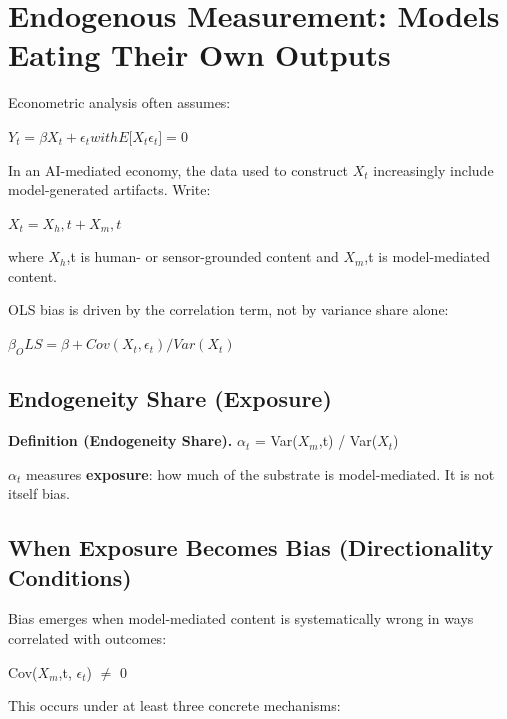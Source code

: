 \documentclass[11pt,a4paper]{article}
\begin{document}
\hypertarget{endogenous-measurement-models-eating-their-own-outputs}{%
\section{Endogenous Measurement: Models Eating Their Own Outputs}\label{endogenous-measurement-models-eating-their-own-outputs}}

Econometric analysis often assumes:

$Y_t = \beta X_t + \epsilon_t with E{[}X_t \epsilon_t{]} = 0$

In an AI-mediated economy, the data used to construct $X_t$ increasingly include model-generated artifacts. Write:

$X_t = X_h,t + X_m,t$

where $X_h$,t is human- or sensor-grounded content and $X_m$,t is model-mediated content.

OLS bias is driven by the correlation term, not by variance share alone:

$\beta_OLS = \beta + Cov(X_t, \epsilon_t) / Var(X_t)$

\hypertarget{endogeneity-share-exposure}{%
\subsection{ Endogeneity Share (Exposure)}\label{endogeneity-share-exposure}}

\textbf{Definition (Endogeneity Share).} $\alpha_{t}$ = Var($X_m$,t) / Var($X_t$)

$\alpha_{t}$ measures \textbf{exposure}: how much of the substrate is model-mediated. It is not itself bias.

\hypertarget{when-exposure-becomes-bias-directionality-conditions}{%
\subsection{ When Exposure Becomes Bias (Directionality Conditions)}\label{when-exposure-becomes-bias-directionality-conditions}}

Bias emerges when model-mediated content is systematically wrong in ways correlated with outcomes:

Cov($X_m$,t, $\epsilon_{t}$) $\neq$ 0

This occurs under at least three concrete mechanisms:
\end{document}
